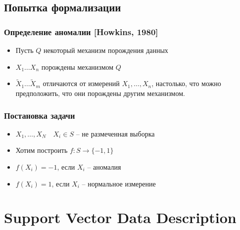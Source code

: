 \documentclass[10pt,pdf]{beamer}
\begin{document}
\subsection{Попытка формализации}
\begin{frame}\frametitle{Определение аномалии [Howkins, 1980]}
\begin{itemize}
\item Пусть $Q$ некоторый механизм порождения данных
\item $X_1\ldots X_n$ порождены механизмом $Q$
\item $\tilde{X}_1 \ldots \tilde{X}_m$ отличаются от измерений $X_1, \ldots, X_n$, настолько, что можно предположить, что они порождены другим механизмом.
\end{itemize}
\end{frame}

\begin{frame}\frametitle{Постановка задачи}

\begin{itemize}
\item $X_1, \ldots, X_N \quad X_i \in S$ -- не размеченная выборка
\item Хотим построить $f \colon S \to \{-1, 1\}$ 
\item $f(X_i) = -1$, если $X_i$ -- аномалия
\item $f(X_i) = 1$, если $X_i$ -- нормальное измерение
\end{itemize}

\end{frame}




\section{Support Vector Data Description}
\end{document}
